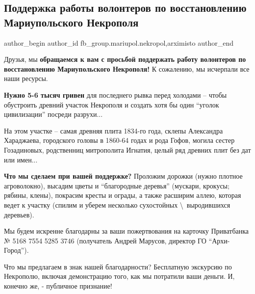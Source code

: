  
 
 
 
 

\subsection{Поддержка работы волонтеров по восстановлению Мариупольского Некрополя}
\label{sec:06_11_2020.fb.fb_group.mariupol.nekropol.1.podderzhka_raboty_volonterov}
 
\ifcmt
 author_begin
   author_id fb_group.mariupol.nekropol,arximisto
 author_end
\fi

\bigskip

Друзья, мы \textbf{обращаемся к вам с просьбой поддержать работу волонтеров по
восстановлению Мариупольского Некрополя!} К сожалению, мы исчерпали все наши
ресурсы.

\textbf{Нужно 5-6 тысяч гривен} для последнего рывка перед холодами – чтобы обустроить
древний участок Некрополя и создать хотя бы один \enquote{уголок цивилизации} посреди
разрухи...

На этом участке – самая древняя плита 1834-го года, склепы Александра
Хараджаева, городского головы в 1860-64 годах и рода Гофов, могила сестер
Гозадиновых, родственниц митрополита Игнатия, целый ряд древних плит без дат
или имен...

\textbf{Что мы сделаем при вашей поддержке?} Проложим дорожки (нужно плотное
агроволокно), высадим цветы и \enquote{благородные деревья} (мускари, крокусы; рябины,
клены), покрасим кресты и ограды, а также расширим аллею, которая ведет к
участку (спилим и уберем несколько сухостойных \textbackslash\ выродившихся деревьев).

Мы будем искренне благодарны за ваши пожертвования на карточку Приватбанка №
5168 7554 5285 3746 (получатель Андрей Марусов, директор ГО \enquote{Архи-Город}).

Что мы предлагаем в знак нашей благодарности? Бесплатную экскурсию по
Некрополю, включая демонстрацию того, как мы потратили ваши деньги. И, конечно
же, - публичное признание!

